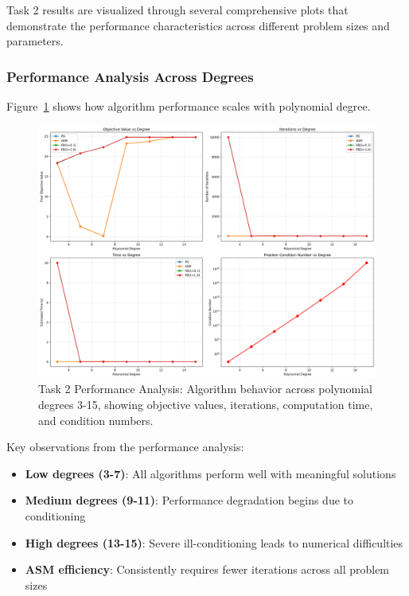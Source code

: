 \documentclass[11pt,a4paper]{article}
\begin{document}
Task 2 results are visualized through several comprehensive plots that demonstrate the performance characteristics across different problem sizes and parameters.

\subsubsection{Performance Analysis Across Degrees}

Figure~\ref{fig:task2_performance} shows how algorithm performance scales with polynomial degree.

\begin{figure}[h]
\centering
\includegraphics[width=\textwidth]{../results/plots/task2_performance_analysis.png}
\caption{Task 2 Performance Analysis: Algorithm behavior across polynomial degrees 3-15, showing objective values, iterations, computation time, and condition numbers.}
\label{fig:task2_performance}
\end{figure}

Key observations from the performance analysis:
\begin{itemize}
    \item \textbf{Low degrees (3-7)}: All algorithms perform well with meaningful solutions
    \item \textbf{Medium degrees (9-11)}: Performance degradation begins due to conditioning
    \item \textbf{High degrees (13-15)}: Severe ill-conditioning leads to numerical difficulties
    \item \textbf{ASM efficiency}: Consistently requires fewer iterations across all problem sizes
\end{itemize}
\end{document}
